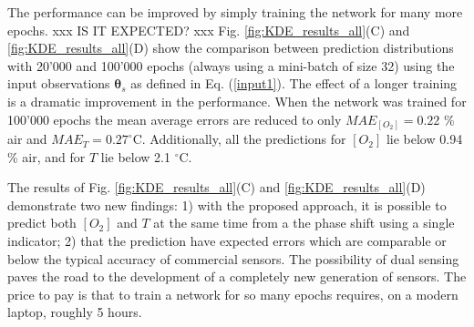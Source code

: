\documentclass[9pt,twocolumn,twoside,pdftex]{optica}
\begin{document}

The performance can be improved by simply training the network for many more epochs. xxx IS IT EXPECTED? xxx Fig. \ref{fig:KDE_results_all}(C) and \ref{fig:KDE_results_all}(D) show the comparison between prediction distributions with 20'000 and 100'000 epochs (always using a mini-batch of size 32) using the input observations ${\pmb \theta}_s$ as defined in Eq. (\ref{input1}). The effect of a longer training is a dramatic improvement in the performance. When the network was trained for 100'000 epochs the mean average errors are reduced to only $MAE_{[O_2]}=0.22$ \% air and $MAE_{T}=0.27^\circ$C. Additionally, all the predictions for $[O_2]$ lie below 0.94 \% air, and for $T$ lie below 2.1 $^\circ$C.

The results of Fig. \ref{fig:KDE_results_all}(C) and \ref{fig:KDE_results_all}(D) demonstrate two new findings: 1) with the proposed approach, it is possible to predict both $[O_2]$ and $T$ at the same time from a the phase shift using a single indicator; 2) that the prediction have expected errors which are comparable or below the typical accuracy of commercial sensors. The possibility of dual sensing paves the road to the development of a completely new generation of sensors.
The price to pay is that to train a network for so many epochs requires, on a modern laptop, roughly 5 hours.

\end{document}
